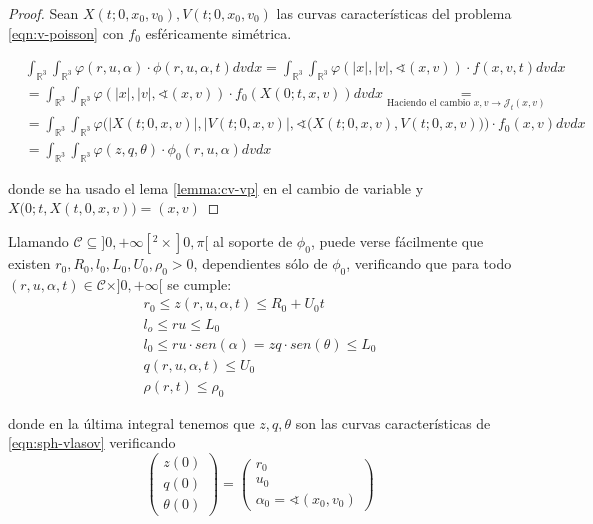 \documentclass[a4paper,10pt]{scrartcl}
\theoremstyle{definition}
\numberwithin{equation}{section}
\begin{document}
\begin{proof}
Sean $X(t; 0, x_0, v_0), V(t; 0, x_0, v_0)$ las curvas características del problema \eqref{eqn:v-poisson} con $f_0$ esféricamente simétrica.

 \begin{align*}
 &\int_{\mathbb{R}^3}\int_{\mathbb{R}^3} \varphi(r,u,\alpha) \cdot \phi(r,u,\alpha,t) dv dx = \int_{\mathbb{R}^3}\int_{\mathbb{R}^3} \varphi(|x|,|v|,\sphericalangle(x,v)) \cdot f(x,v,t) dv dx \\
 &= \int_{\mathbb{R}^3}\int_{\mathbb{R}^3} \varphi(|x|,|v|,\sphericalangle(x,v)) \cdot f_0(X(0;t,x,v)) dv dx \underset{\textrm{Haciendo el cambio } x,v \rightarrow \mathcal{J}_t(x,v)}{=}\\
 &=\int_{\mathbb{R}^3}\int_{\mathbb{R}^3} \varphi\bigg(|X(t;0,x,v)|,|V(t;0,x,v)|,\sphericalangle\bigg(X(t;0,x,v), V(t;0,x,v)\bigg)\bigg) \cdot f_0(x,v) dv dx \\
 &= \int_{\mathbb{R}^3}\int_{\mathbb{R}^3} \varphi(z,q,\theta) \cdot \phi_0(r,u,\alpha) dv dx
 \end{align*}

 donde se ha usado el lema \ref{lemma:cv-vp} en el cambio de variable y $X\bigg(0;t,X(t,0,x,v)\bigg) = (x,v)$
\end{proof}


Llamando $\mathcal{C} \subseteq ]0, +\infty[^2 \times ]0, \pi[$ al soporte de $\phi_0$, puede verse fácilmente que existen $r_0, R_0, l_0, L_0, U_0, \rho_0 > 0$, dependientes sólo de $\phi_0$, verificando que para todo $(r,u,\alpha,t) \in \mathcal{C} \times ]0, +\infty[$ se cumple:
\begin{align}
 r_0 \le z(r,u,\alpha,t) \le R_0 + U_0 t \nonumber\\
 l_o \le ru \le L_0 \nonumber\\
 l_0 \le ru \cdot sen(\alpha) = zq \cdot sen(\theta) \le L_0 \nonumber\\
 q(r,u,\alpha, t) \le U_0 \nonumber \\
 \rho(r,t) \le \rho_0 \label{eqn:zbounds}
\end{align}

donde en la última integral tenemos que $z,q,\theta$ son las curvas características de \eqref{eqn:sph-vlasov} verificando 
\[
    \left(\begin{array}{c} z(0)\\ q(0)\\ \theta(0) \end{array}\right) = 
    \left(\begin{array}{c} r_0\\ u_0\\ \alpha_0 =\sphericalangle(x_0, v_0) \end{array}\right)
\]
\end{document}
